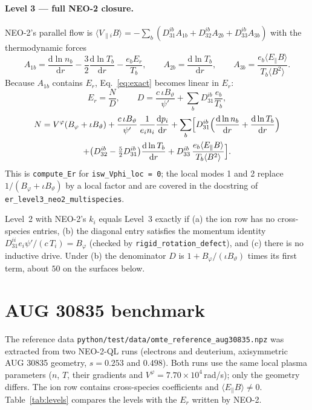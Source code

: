 \documentclass[11pt]{article}
\newcommand{\rd}{\mathrm{d}}
\newcommand{\tht}{\vartheta}
\newcommand{\ph}{\varphi}
\newcommand{\code}[1]{\texttt{#1}}
\begin{document}
\paragraph{Level 3 --- full NEO-2 closure.}  NEO-2's parallel flow is
$\langle V_{\parallel i}B\rangle = -\sum_b (D_{31}^{ib}A_{1b} + D_{32}^{ib}A_{2b}
+ D_{33}^{ib}A_{3b})$ with the thermodynamic forces \cite{Kernbichler2016}
\begin{equation}\label{eq:forces}
  A_{1b} = \frac{\rd\ln n_b}{\rd r} - \frac{3}{2}\frac{\rd\ln T_b}{\rd r}
         - \frac{e_b E_r}{T_b},
  \qquad
  A_{2b} = \frac{\rd\ln T_b}{\rd r},
  \qquad
  A_{3b} = \frac{e_b\langle E_\parallel B\rangle}{T_b\langle B^2\rangle}.
\end{equation}
Because $A_{1b}$ contains $E_r$, Eq.~\eqref{eq:exact} becomes linear in $E_r$:
\begin{equation}\label{eq:level3}
  E_r = \frac{N}{D},\qquad
  D = \frac{c\,\iota B_\tht}{\psi'} + \sum_b D_{31}^{ib}\frac{e_b}{T_b},
\end{equation}
\begin{multline*}
  N = V^\ph(B_\ph + \iota B_\tht)
    + \frac{c\,\iota B_\tht}{\psi'}\,\frac{1}{e_i n_i}\frac{\rd p_i}{\rd r}
    + \sum_b\Bigl[D_{31}^{ib}\Bigl(\frac{\rd\ln n_b}{\rd r}
                                   + \frac{\rd\ln T_b}{\rd r}\Bigr) \\
      + \bigl(D_{32}^{ib} - \tfrac{5}{2}D_{31}^{ib}\bigr)\frac{\rd\ln T_b}{\rd r}
      + D_{33}^{ib}\,\frac{e_b\langle E_\parallel B\rangle}{T_b\langle B^2\rangle}
    \Bigr].
\end{multline*}
This is \code{compute\_Er} for \code{isw\_Vphi\_loc = 0}; the local modes
1 and 2 replace $1/(B_\ph + \iota B_\tht)$ by a local factor and are covered
in the docstring of \code{er\_level3\_neo2\_multispecies}.

Level~2 with NEO-2's $k_i$ equals Level~3 exactly if (a) the ion row has no
cross-species entries, (b) the diagonal entry satisfies the momentum identity
$D_{31}^{ii}e_i\psi'/(c\,T_i) = B_\ph$ (checked by
\code{rigid\_rotation\_defect}), and (c) there is no inductive drive.  Under
(b) the denominator $D$ is $1 + B_\ph/(\iota B_\tht)$ times its first term,
about $50$ on the surfaces below.

\section{AUG 30835 benchmark}\label{sec:aug}

The reference data \code{python/test/data/omte\_reference\_aug30835.npz} was
extracted from two NEO-2-QL runs (electrons and deuterium, axisymmetric AUG
30835 geometry, $s = 0.253$ and $0.498$).  Both runs use the same local
plasma parameters ($n$, $T$, their gradients and $V^\ph = 7.70\times10^4$\,rad/s);
only the geometry differs.  The ion row contains cross-species coefficients
and $\langle E_\parallel B\rangle \neq 0$.  Table~\ref{tab:levels} compares
the levels with the $E_r$ written by NEO-2.
\end{document}
